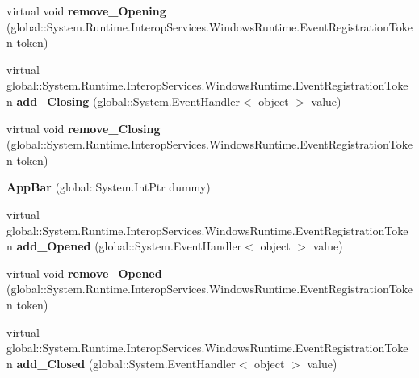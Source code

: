 \begin{DoxyCompactItemize}
virtual void {\bfseries remove\+\_\+\+Opening} (global\+::\+System.\+Runtime.\+Interop\+Services.\+Windows\+Runtime.\+Event\+Registration\+Token token)
\item 
\mbox{\label{class_windows_1_1_u_i_1_1_xaml_1_1_controls_1_1_app_bar_a669f99f9098da8948468675637292c38}} 
virtual global\+::\+System.\+Runtime.\+Interop\+Services.\+Windows\+Runtime.\+Event\+Registration\+Token {\bfseries add\+\_\+\+Closing} (global\+::\+System.\+Event\+Handler$<$ object $>$ value)
\item 
\mbox{\label{class_windows_1_1_u_i_1_1_xaml_1_1_controls_1_1_app_bar_a4c8dc6e33234645dfc8de750f6172acc}} 
virtual void {\bfseries remove\+\_\+\+Closing} (global\+::\+System.\+Runtime.\+Interop\+Services.\+Windows\+Runtime.\+Event\+Registration\+Token token)
\item 
\mbox{\label{class_windows_1_1_u_i_1_1_xaml_1_1_controls_1_1_app_bar_a7504764229ad22d4e22e97ea76d33d92}} 
{\bfseries App\+Bar} (global\+::\+System.\+Int\+Ptr dummy)
\item 
\mbox{\label{class_windows_1_1_u_i_1_1_xaml_1_1_controls_1_1_app_bar_ad5f3931660e32abe22fcee131b86c49d}} 
virtual global\+::\+System.\+Runtime.\+Interop\+Services.\+Windows\+Runtime.\+Event\+Registration\+Token {\bfseries add\+\_\+\+Opened} (global\+::\+System.\+Event\+Handler$<$ object $>$ value)
\item 
\mbox{\label{class_windows_1_1_u_i_1_1_xaml_1_1_controls_1_1_app_bar_ac34208d86f3483385078caf53adad003}} 
virtual void {\bfseries remove\+\_\+\+Opened} (global\+::\+System.\+Runtime.\+Interop\+Services.\+Windows\+Runtime.\+Event\+Registration\+Token token)
\item 
\mbox{\label{class_windows_1_1_u_i_1_1_xaml_1_1_controls_1_1_app_bar_a4a1f77613cd6cf4250c8b5d04fb9f853}} 
virtual global\+::\+System.\+Runtime.\+Interop\+Services.\+Windows\+Runtime.\+Event\+Registration\+Token {\bfseries add\+\_\+\+Closed} (global\+::\+System.\+Event\+Handler$<$ object $>$ value)

\end{DoxyCompactItemize}
